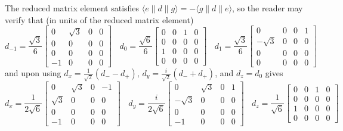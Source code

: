\documentclass[11pt,letter]{article}
\begin{document}
The reduced matrix element satisfies   $\langle e \lVert d \rVert g \rangle = -
\langle g \lVert d \rVert e \rangle$, so the reader may verify that (in units of the reduced matrix element) 
\begin{equation}
    d_{-1}  = \frac{\sqrt{3}}{6}  
            \left[\begin{smallmatrix}
            0 & \sqrt{3} & 0 & 0\\
            0 & 0 & 0 & 0\\
            0 & 0 & 0 & 0\\
            -1 & 0 & 0 & 0
            \end{smallmatrix}\right] \ \ \ \
    d_{0}  =  \frac{\sqrt{6}}{6}   
              \left[\begin{smallmatrix}
              0 & 0 & 1 & 0\\
              0 & 0 & 0 & 0\\
              1 & 0 & 0 & 0\\
              0 & 0 & 0 & 0
              \end{smallmatrix}\right] \ \ \ \
    d_{1} =   \frac{\sqrt{3}}{6} 
              \left[\begin{smallmatrix}
              0 & 0 & 0 & 1\\
              -\sqrt{3} & 0 & 0 & 0\\
              0 & 0 & 0 & 0\\
              0 & 0 & 0 & 0
              \end{smallmatrix}\right]
\end{equation}
and upon using $d_{x}= \frac{1}{\sqrt{2}}( d_{-} - d_{+} )$,  $d_{y} =
\frac{i}{\sqrt{2}}( d_{-} + d_{+} )$, and $d_{z} = d_{0}$ gives
\begin{equation}
    d_{x}  = \frac{1}{2\sqrt{6}}  
            \left[\begin{smallmatrix}
            0 &  \sqrt{3} & 0 & -1\\
            \sqrt{3} & 0 & 0 & 0\\
            0 & 0 & 0 & 0\\
            -1 & 0 & 0 & 0
            \end{smallmatrix}\right] \ \ \ \ 
    d_{y} =   \frac{i}{2\sqrt{6}} 
              \left[\begin{smallmatrix}
              0 & \sqrt{3} & 0 & 1\\
              -\sqrt{3} & 0 & 0 & 0\\
              0 & 0 & 0 & 0\\
              -1 & 0 & 0 & 0
              \end{smallmatrix}\right] \ \ \ \
    d_{z}  =  \frac{1}{\sqrt{6}}   
              \left[\begin{smallmatrix}
              0 & 0 & 1 & 0\\
              0 & 0 & 0 & 0\\
              1 & 0 & 0 & 0\\
              0 & 0 & 0 & 0
              \end{smallmatrix}\right]  
\end{equation}
\end{document}

